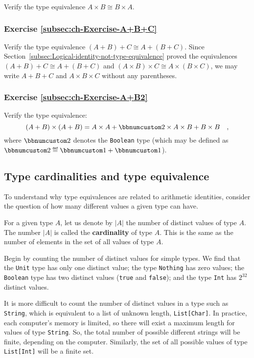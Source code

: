 Verify the type equivalence $A\times B\cong B\times A$.

\subsubsection{Exercise \label{subsec:ch-Exercise-A+B+C}\ref{subsec:ch-Exercise-A+B+C}}

Verify the type equivalence $\left(A+B\right)+C\cong A+\left(B+C\right)$.
Since Section~\ref{subsec:Logical-identity-not-type-equivalence}
proved the equivalences $\left(A+B\right)+C\cong A+\left(B+C\right)$
and $\left(A\times B\right)\times C\cong A\times\left(B\times C\right)$,
we may write $A+B+C$ and $A\times B\times C$ without any parentheses.

\subsubsection{Exercise \label{subsec:ch-Exercise-A+B2}\ref{subsec:ch-Exercise-A+B2}}

Verify the type equivalence:
\[
\left(A+B\right)\times\left(A+B\right)=A\times A+\bbnum 2\times A\times B+B\times B\quad,
\]
where $\bbnum 2$ denotes the \lstinline!Boolean! type
(which may be defined as $\bbnum 2\triangleq\bbnum 1+\bbnum 1$).

\subsection{Type cardinalities and type equivalence}

To understand why type equivalences are related to arithmetic identities,
consider the question of how many different values a given type can
have.

For a given type $A$, let us denote by $\left|A\right|$ the number
of distinct values of type $A$. The number $\left|A\right|$ is called
the \textbf{cardinality} of type $A$. This is
the same as the number of elements in the set of all values of type
$A$. 

Begin by counting the number of distinct values for simple types.
We find that the \lstinline!Unit! type has only one distinct value;
the type \lstinline!Nothing! has zero values; the \lstinline!Boolean!
type has two distinct values (\lstinline!true! and \lstinline!false!);
and the type \lstinline!Int! has $2^{32}$ distinct values.

It is more difficult to count the number of distinct values in a type
such as \lstinline!String!, which is equivalent to a list of unknown
length, \lstinline!List[Char]!. In practice, each computer\textsf{'}s memory
is limited, so there will exist a maximum length for values of type
\lstinline!String!. So, the total number of possible different strings
will be finite, depending on the computer. Similarly, the set of all
possible values of type \lstinline!List[Int]! will be a finite set.

